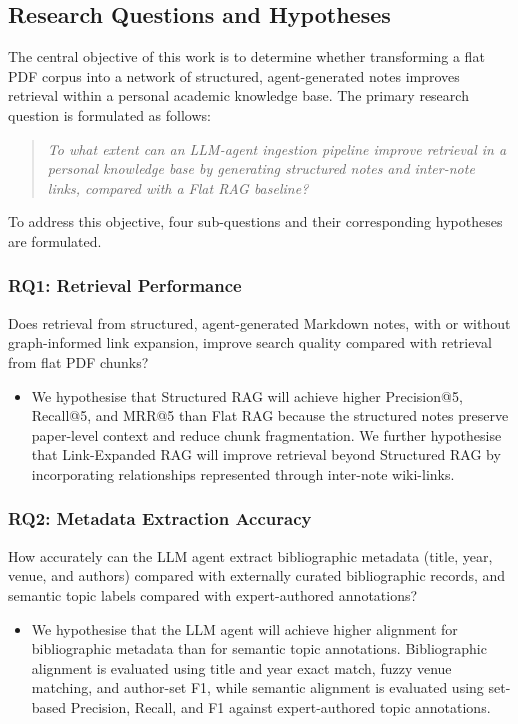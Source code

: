 \documentclass[runningheads]{llncs}
\begin{document}
\subsection{Research Questions and Hypotheses}
\label{sec:rqs}

The central objective of this work is to determine whether transforming a flat PDF corpus into a network of structured, agent-generated notes improves retrieval within a personal academic knowledge base. The primary research question is formulated as follows:

\begin{quote}
\textit{To what extent can an LLM-agent ingestion pipeline improve retrieval in a personal knowledge base by generating structured notes and inter-note links, compared with a Flat RAG baseline?}
\end{quote}

To address this objective, four sub-questions and their corresponding hypotheses are formulated.

\subsubsection{RQ1: Retrieval Performance}

Does retrieval from structured, agent-generated Markdown notes, with or without graph-informed link expansion, improve search quality compared with retrieval from flat PDF chunks?

\begin{itemize}
\item[\textbf{H1:}] We hypothesise that Structured RAG will achieve higher Precision@5, Recall@5, and MRR@5 than Flat RAG because the structured notes preserve paper-level context and reduce chunk fragmentation. We further hypothesise that Link-Expanded RAG will improve retrieval beyond Structured RAG by incorporating relationships represented through inter-note wiki-links.
\end{itemize}

\subsubsection{RQ2: Metadata Extraction Accuracy}

How accurately can the LLM agent extract bibliographic metadata (title, year, venue, and authors) compared with externally curated bibliographic records, and semantic topic labels compared with expert-authored annotations?

\begin{itemize}
\item[\textbf{H2:}] We hypothesise that the LLM agent will achieve higher alignment for bibliographic metadata than for semantic topic annotations. Bibliographic alignment is evaluated using title and year exact match, fuzzy venue matching, and author-set F1, while semantic alignment is evaluated using set-based Precision, Recall, and F1 against expert-authored topic annotations.
\end{itemize}
\end{document}
